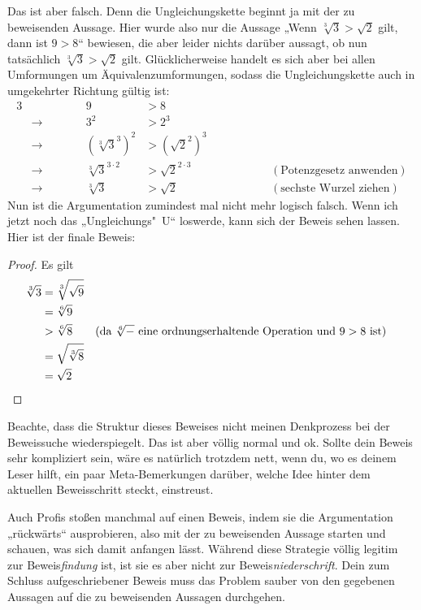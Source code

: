 \begin{bem}
    Das ist aber falsch. Denn die Ungleichungskette beginnt ja mit der zu beweisenden Aussage. Hier wurde also nur die Aussage „Wenn $\sqrt[3]{3} >\sqrt{2}$ gilt, dann ist $9>8$“ bewiesen, die aber leider nichts darüber aussagt, ob nun tatsächlich $\sqrt[3]{3} >\sqrt{2}$ gilt. Glücklicherweise handelt es sich aber bei allen Umformungen um Äquivalenzumformungen, sodass die Ungleichungskette auch in umgekehrter Richtung gültig ist:
    \begin{alignat*}{3}
        &\qquad\qquad& 9 & > 8 \\
        & \to & 3^2 & > 2^3 \\
        & \to & (\sqrt[3]{3}^3)^2 & > (\sqrt{2}^2)^3 \\
        & \to& \sqrt[3]{3}^{3\cdot 2} & > \sqrt{2}^{2\cdot 3} &\qquad\qquad& (\text{Potenzgesetz anwenden}) \\
        &\to &  \sqrt[3]{3}& >\sqrt{2}  && (\text{sechste Wurzel ziehen})
    \end{alignat*}
    Nun ist die Argumentation zumindest mal nicht mehr logisch falsch. Wenn ich jetzt noch das „Ungleichungs"~U“ loswerde, kann sich der Beweis sehen lassen. Hier ist der finale Beweis:
    \begin{proof}
        Es gilt
        \begingroup
        \allowdisplaybreaks
        \begin{align*}
            \sqrt[3]{3} & = \sqrt[3]{\sqrt{9}} \\
            & = \sqrt[6]{9} \\
            & > \sqrt[6]{8} & (\text{da $\sqrt[6]{-}$ eine ordnungserhaltende Operation und $9>8$ ist}) \\
            & = \sqrt{\sqrt[3]{8}} \\
            & = \sqrt{2} && \qedhere
        \end{align*}
        \endgroup
    \end{proof}
    Beachte, dass die Struktur dieses Beweises nicht meinen Denkprozess bei der Beweissuche wiederspiegelt. Das ist aber völlig normal und ok. Sollte dein Beweis sehr kompliziert sein, wäre es natürlich trotzdem nett, wenn du, wo es deinem Leser hilft, ein paar Meta-Bemerkungen darüber, welche Idee hinter dem aktuellen Beweisschritt steckt, einstreust.
    
    Auch Profis stoßen manchmal auf einen Beweis, indem sie die Argumentation „rückwärts“ ausprobieren, also mit der zu beweisenden Aussage starten und schauen, was sich damit anfangen lässt. Während diese Strategie völlig legitim zur Beweis\emph{findung} ist, ist sie es aber nicht zur Beweis\emph{niederschrift}. Dein zum Schluss aufgeschriebener Beweis muss das Problem sauber von den gegebenen Aussagen auf die zu beweisenden Aussagen durchgehen.
    

\end{bem}

